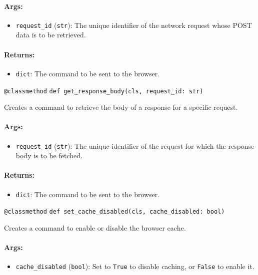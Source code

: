 \documentclass{article}
\begin{document}
\paragraph{Args:}
\begin{itemize}
    \item \texttt{request\_id} (\texttt{str}): The unique identifier of the network request whose POST data is to be retrieved.
\end{itemize}

\paragraph{Returns:}
\begin{itemize}
    \item \texttt{dict}: The command to be sent to the browser.
\end{itemize}

\noindent\texttt{@classmethod}
\noindent\texttt{def get\_response\_body(cls, request\_id: str)}

\noindent Creates a command to retrieve the body of a response for a specific request.

\paragraph{Args:}
\begin{itemize}
    \item \texttt{request\_id} (\texttt{str}): The unique identifier of the request for which the response body is to be fetched.
\end{itemize}

\paragraph{Returns:}
\begin{itemize}
    \item \texttt{dict}: The command to be sent to the browser.
\end{itemize}

\noindent\texttt{@classmethod}
\noindent\texttt{def set\_cache\_disabled(cls, cache\_disabled: bool)}

\noindent Creates a command to enable or disable the browser cache.

\paragraph{Args:}
\begin{itemize}
    \item \texttt{cache\_disabled} (\texttt{bool}): Set to \texttt{True} to disable caching, or \texttt{False} to enable it.
\end{itemize}
\end{document}
